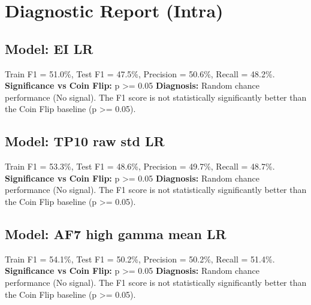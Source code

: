 \section*{Diagnostic Report (Intra)}
\subsection*{Model: EI LR}
Train F1 = 51.0\%, Test F1 = 47.5\%, Precision = 50.6\%, Recall = 48.2\%.
\newline
\textbf{Significance vs Coin Flip:} p >= 0.05
\newline
\textbf{Diagnosis:} Random chance performance (No signal). The F1 score is not statistically significantly better than the Coin Flip baseline (p >= 0.05).

\subsection*{Model: TP10 raw std LR}
Train F1 = 53.3\%, Test F1 = 48.6\%, Precision = 49.7\%, Recall = 48.7\%.
\newline
\textbf{Significance vs Coin Flip:} p >= 0.05
\newline
\textbf{Diagnosis:} Random chance performance (No signal). The F1 score is not statistically significantly better than the Coin Flip baseline (p >= 0.05).

\subsection*{Model: AF7 high gamma mean LR}
Train F1 = 54.1\%, Test F1 = 50.2\%, Precision = 50.2\%, Recall = 51.4\%.
\newline
\textbf{Significance vs Coin Flip:} p >= 0.05
\newline
\textbf{Diagnosis:} Random chance performance (No signal). The F1 score is not statistically significantly better than the Coin Flip baseline (p >= 0.05).
